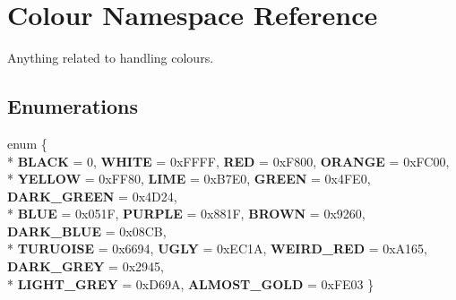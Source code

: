 \hypertarget{namespaceColour}{}\section{Colour Namespace Reference}
\label{namespaceColour}


Anything related to handling colours.  


\subsection*{Enumerations}
\begin{DoxyCompactItemize}
\item 
enum \{ \\*
{\bfseries B\+L\+A\+CK} = 0, 
{\bfseries W\+H\+I\+TE} = 0x\+F\+F\+FF, 
{\bfseries R\+ED} = 0x\+F800, 
{\bfseries O\+R\+A\+N\+GE} = 0x\+F\+C00, 
\\*
{\bfseries Y\+E\+L\+L\+OW} = 0x\+F\+F80, 
{\bfseries L\+I\+ME} = 0x\+B7\+E0, 
{\bfseries G\+R\+E\+EN} = 0x4\+F\+E0, 
{\bfseries D\+A\+R\+K\+\_\+\+G\+R\+E\+EN} = 0x4\+D24, 
\\*
{\bfseries B\+L\+UE} = 0x051F, 
{\bfseries P\+U\+R\+P\+LE} = 0x881F, 
{\bfseries B\+R\+O\+WN} = 0x9260, 
{\bfseries D\+A\+R\+K\+\_\+\+B\+L\+UE} = 0x08\+CB, 
\\*
{\bfseries T\+U\+R\+U\+O\+I\+SE} = 0x6694, 
{\bfseries U\+G\+LY} = 0x\+E\+C1A, 
{\bfseries W\+E\+I\+R\+D\+\_\+\+R\+ED} = 0x\+A165, 
{\bfseries D\+A\+R\+K\+\_\+\+G\+R\+EY} = 0x2945, 
\\*
{\bfseries L\+I\+G\+H\+T\+\_\+\+G\+R\+EY} = 0x\+D69A, 
{\bfseries A\+L\+M\+O\+S\+T\+\_\+\+G\+O\+LD} = 0x\+F\+E03
 \}\hypertarget{namespaceColour_a7eacc5e4e794b134ef740aa5426df245}{}\label{namespaceColour_a7eacc5e4e794b134ef740aa5426df245}

\end{DoxyCompactItemize}
